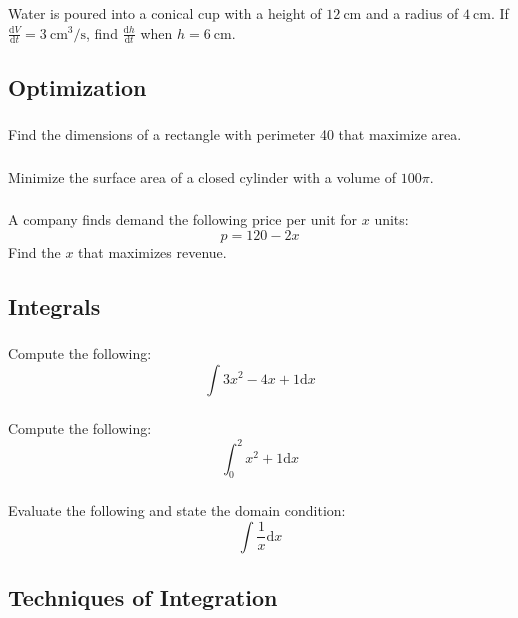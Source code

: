 \documentclass[12pt]{article}
\newcommand{\dd}{\text{d}}
\begin{document}
			\subsubsection{}
				Water is poured into a conical cup with a height of \(\qty{12}{\centi\meter}\) and a radius of \(\qty{4}{\centi\meter}\). If \(\frac{\dd V}{\dd t}=\qty{3}{\centi\meter\cubed\per\second}\), find \(\frac{\dd h}{\dd t}\) when \(h=\qty{6}{\centi\meter}\).

		\subsection{Optimization}
			\subsubsection{}
				Find the dimensions of a rectangle with perimeter 40 that maximize area.
			\subsubsection{}
				Minimize the surface area of a closed cylinder with a volume of \(100\pi\).
			\subsubsection{}
				A company finds demand the following price per unit for \(x\) units:
				\[p=120-2x\]
				Find the \(x\) that maximizes revenue.

		\subsection{Integrals}
			\subsubsection{}
				Compute the following:
				\[\int{3x^2-4x+1\dd x}\]
			\subsubsection{}
				Compute the following:
				\[\int_0^2{x^2+1\dd x}\]
			\subsubsection{}
				Evaluate the following and state the domain condition:
				\[\int{\frac{1}{x}\dd x}\]

		\subsection{Techniques of Integration}
\end{document}
